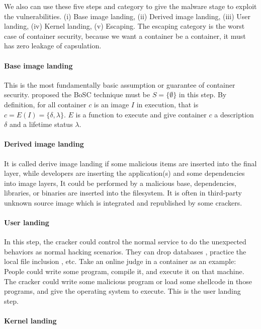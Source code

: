 We also can use these five steps and category to give the malware stage to exploit the vulnerabilities.
(\Rn{1}) Base image landing, (\Rn{2}) Derived image landing, (\Rn{3}) User landing, (\Rn{4}) Kernel landing,
(\Rn{5}) Escaping. The escaping category is the worst case of container security, because we want a
container be a container, it must has zero leakage of capsulation.

\paragraph{Base image landing}
This is the most fundamentally basic assumption or guarantee of container security.
\textcite{8473370} proposed the BoSC technique must be $S = \{\emptyset\}$ in this step. By definition, for all
container $c$ is an image $I$ in execution, that is  $c = E(I) = \{\delta, \lambda\}$. $E$ is a function to execute and
give container $c$ a description $\delta$ and a lifetime status $\lambda$.

\paragraph{Derived image landing}
It is called derive image landing if some malicious items are inserted into the final layer,
while developers are inserting the application(s) and some dependencies into image layers,
It could be performed by a malicious base, dependencies, libraries, or binaries are inserted
into the filesystem. It is often in third-party unknown source image which is integrated
and republished by some crackers.

\paragraph{User landing}
In this step, the cracker could control the normal service to do the unexpected behaviors as
normal hacking scenarios. They can drop databases \cite{halfond2006classification} , practice
the local file inclusion \cite{hassan2018saisan, whitman2011principles}, etc.
Take an online judge in a container as an example: People could write some program, compile it, and execute it
on that machine. The cracker could write some malicious program or load some shellcode in those programs,
and give the operating system to execute. This is the user landing step.

\paragraph{Kernel landing}


